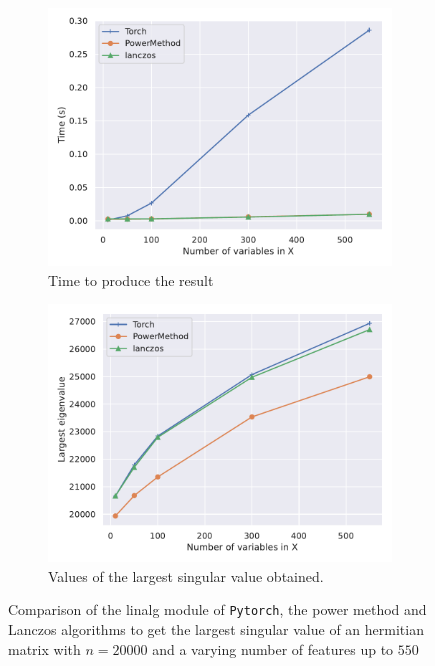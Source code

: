 \documentclass[a4]{article}
\begin{document}
\begin{figure}[!h]
	\begin{subfigure}{.45\textwidth}
		\centering
		\includegraphics[scale = 0.44]{./prebuilt_images/benchmark_powermethod_scipy_n20000p550.pdf}
		\caption{Time to produce the result}
	\end{subfigure}
	\begin{subfigure}{.45\textwidth}
		\centering
		\includegraphics[scale = 0.43]{./prebuilt_images/benchmark_powermethod_scipy_values_n20000p550.pdf}
		\caption{Values of the largest singular value obtained.}
	\end{subfigure}
	\caption{Comparison of the linalg module of \texttt{Pytorch}, the power method and Lanczos algorithms to get the largest singular value of an hermitian matrix with $n=20000$ and a varying number of features up to $550$ }
	\label{fig:lanczos}
\end{figure}
\end{document}
